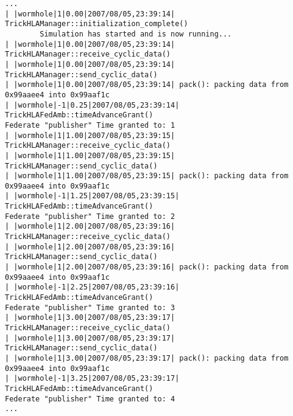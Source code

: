 \begin{lstlisting}[numbers=none,caption={Output from the unpacker simulation}]
...
| |wormhole|1|0.00|2007/08/05,23:39:14| TrickHLAManager::initialization_complete()
        Simulation has started and is now running...
| |wormhole|1|0.00|2007/08/05,23:39:14| TrickHLAManager::receive_cyclic_data()
| |wormhole|1|0.00|2007/08/05,23:39:14| TrickHLAManager::send_cyclic_data()
| |wormhole|1|0.00|2007/08/05,23:39:14| pack(): packing data from 0x99aaee4 into 0x99aaf1c
| |wormhole|-1|0.25|2007/08/05,23:39:14| TrickHLAFedAmb::timeAdvanceGrant()
Federate "publisher" Time granted to: 1
| |wormhole|1|1.00|2007/08/05,23:39:15| TrickHLAManager::receive_cyclic_data()
| |wormhole|1|1.00|2007/08/05,23:39:15| TrickHLAManager::send_cyclic_data()
| |wormhole|1|1.00|2007/08/05,23:39:15| pack(): packing data from 0x99aaee4 into 0x99aaf1c
| |wormhole|-1|1.25|2007/08/05,23:39:15| TrickHLAFedAmb::timeAdvanceGrant()
Federate "publisher" Time granted to: 2
| |wormhole|1|2.00|2007/08/05,23:39:16| TrickHLAManager::receive_cyclic_data()
| |wormhole|1|2.00|2007/08/05,23:39:16| TrickHLAManager::send_cyclic_data()
| |wormhole|1|2.00|2007/08/05,23:39:16| pack(): packing data from 0x99aaee4 into 0x99aaf1c
| |wormhole|-1|2.25|2007/08/05,23:39:16| TrickHLAFedAmb::timeAdvanceGrant()
Federate "publisher" Time granted to: 3
| |wormhole|1|3.00|2007/08/05,23:39:17| TrickHLAManager::receive_cyclic_data()
| |wormhole|1|3.00|2007/08/05,23:39:17| TrickHLAManager::send_cyclic_data()
| |wormhole|1|3.00|2007/08/05,23:39:17| pack(): packing data from 0x99aaee4 into 0x99aaf1c
| |wormhole|-1|3.25|2007/08/05,23:39:17| TrickHLAFedAmb::timeAdvanceGrant()
Federate "publisher" Time granted to: 4
...
\end{lstlisting}
